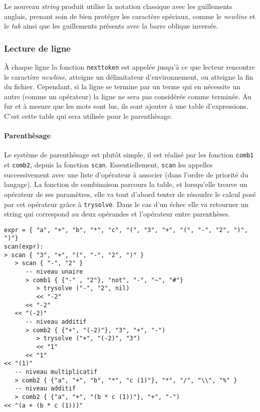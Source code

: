 \documentclass{article}
\begin{document}
Le nouveau \textit{string} produit utilise la notation classique avec les guillements anglais, prenant soin de bien protéger les caractère spéciaux, comme le \textit{newline} et le \textit{tab} ainsi que les guillements présents avec la barre oblique inversée.

\subsubsection{Lecture de ligne}
À chaque ligne la fonction \texttt{nexttoken} est appelée jusqu'à ce que lecteur rencontre le caractère \textit{newline}, atteigne un délimitateur d'environnement, ou atteigne la fin du fichier. Cependant, si la ligne se termine par un terme qui en nécessite un autre (comme un opérateur) la ligne ne sera pas considérée comme terminée. Au fur et à mesure que les mots sont lus, ils sont ajouter à une table d'expressions. C'est cette table qui sera utilisée pour le parenthèsage.
\paragraph{Parenthèsage} 
Le système de parenthèsage est plutôt simple, il est réalisé par les fonction \texttt{comb1} et \texttt{comb2}, depuis la fonction \texttt{scan}. Essentiellement, \texttt{scan} les appelles successivement avec une liste d'opérateur à associer (dans l'ordre de priorité du langage). La fonction de combinaison parcours la table, et lorsqu'elle trouve un opérateur de ses paramètres, elle va tout d'abord tenter de résoudre le calcul posé par cet opérateur grâce à \texttt{trysolve}. Dans le cas d'un échec elle va retourner un string qui correspond au deux opérandes et l'opérateur entre parenthèses.
\begin{lstlisting}[caption={Trace partielle d'exécution de la fonction scan},label=DescriptiveLabel]
expr = { "a", "+", "b", "*", "c", "(", "3", "+", "(", "-", "2", ")", ")"}
scan(expr):
> scan { "3", "+", "(", "-", "2", ")" }
   > scan { "-", "2" }
      -- niveau unaire
      > comb1 { {"-" , "2"}, "not", "-", "~", "#"} 
         > trysolve ("-", "2", nil)
         << "-2"
      << "-2"
   << "(-2)"
      -- niveau additif
      > comb2 { {"+", "(-2)"}, "3", "+", "-") 
         > trysolve ("+", "(-2)", "3")
         << "1"
      << "1"
<< "(1)"
   -- niveau multiplicatif
   > comb2 { {"a", "+", "b", "*", "c (1)"}, "*", "/", "\\", "%" }
   -- niveau additif
   > comb2 { {"a", "+", "(b * c (1))"}, "+", "-")
<< "(a + (b * c (1)))"
\end{lstlisting}
\end{document}
